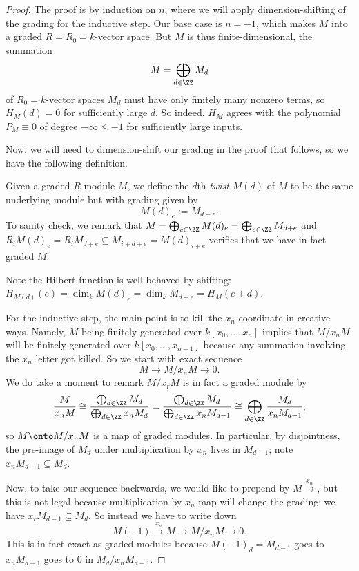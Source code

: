\begin{proof}
	The proof is by induction on $n$, where we will apply dimension-shifting of the grading for the inductive step. Our base case is $n=-1$, which makes $M$ into a graded $R=R_0=k$-vector space. But $M$ is thus finite-dimensional, the summation
	\[M=\bigoplus_{d\in\ZZ}M_d\]
	of $R_0=k$-vector spaces $M_d$ must have only finitely many nonzero terms, so $H_M(d)=0$ for sufficiently large $d$. So indeed, $H_M$ agrees with the polynomial $P_M\equiv0$ of degree $-\infty\le-1$ for sufficiently large inputs.

	Now, we will need to dimension-shift our grading in the proof that follows, so we have the following definition.
	\begin{definition}[Twist]
		Given a graded $R$-module $M$, we define the $d$th \textit{twist} $M(d)$ of $M$ to be the same underlying module but with grading given by
		\[M(d)_e:=M_{d+e}.\]
		To sanity check, we remark that $M=\bigoplus_{e\in\ZZ}M(d)_e=\bigoplus_{e\in\ZZ}M_{d+e}$ and $R_iM(d)_e=R_iM_{d+e}\subseteq M_{i+d+e}=M(d)_{i+e}$ verifies that we have in fact graded $M$.
	\end{definition}
	Note the Hilbert function is well-behaved by shifting: $H_{M(d)}(e)=\dim_kM(d)_e=\dim_kM_{d+e}=H_M(e+d)$.

	For the inductive step, the main point is to kill the $x_n$ coordinate in creative ways. Namely, $M$ being finitely generated over $k[x_0,\ldots,x_n]$ implies that $M/x_nM$ will be finitely generated over $k[x_0,\ldots,x_{n-1}]$ because any summation involving the $x_n$ letter got killed. So we start with exact sequence
	\[M\to M/x_nM\to 0.\]
	We do take a moment to remark $M/x_rM$ is in fact a graded module by
	\[\frac M{x_nM}\cong\frac{\bigoplus_{d\in\ZZ}M_d}{\bigoplus_{d\in\ZZ}x_nM_d}=\frac{\bigoplus_{d\in\ZZ}M_d}{\bigoplus_{d\in\ZZ}x_nM_{d-1}}\cong\bigoplus_{d\in\ZZ}\frac{M_d}{x_nM_{d-1}},\]
	so $M\onto M/x_nM$ is a map of graded modules. In particular, by disjointness, the pre-image of $M_d$ under multiplication by $x_n$ lives in $M_{d-1}$; note $x_nM_{d-1}\subseteq M_d$.
	
	Now, to take our sequence backwards, we would like to prepend by $M\stackrel{x_n}\to$, but this is not legal because multiplication by $x_n$ map will change the grading: we have $x_rM_{d-1}\subseteq M_d$. So instead we have to write down
	\[M(-1)\stackrel{x_n}\to M\to M/x_nM\to 0.\]
	This is in fact exact as graded modules because $M(-1)_d=M_{d-1}$ goes to $x_nM_{d-1}$ goes to $0$ in $M_d/x_nM_{d-1}$.
	

\end{proof}
